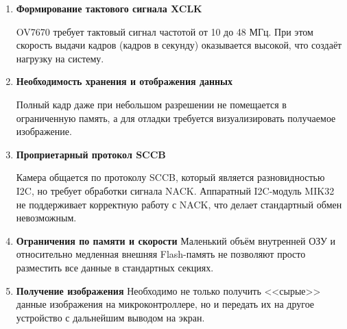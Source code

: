 \documentclass[a4paper]{article}
\begin{document}
    \begin{enumerate}
        \item \textbf{Формирование тактового сигнала XCLK}

        OV7670 требует тактовый сигнал частотой от 10 до 48 МГц. При этом скорость выдачи кадров (кадров в секунду) оказывается высокой, что создаёт нагрузку на систему.

        \item \textbf{Необходимость хранения и отображения данных}

        Полный кадр даже при небольшом разрешении не помещается в ограниченную память, а для отладки требуется визуализировать получаемое изображение.

        \item \textbf{Проприетарный протокол SCCB}

        Камера общается по протоколу SCCB, который является разновидностью I2C, но требует обработки сигнала NACK. Аппаратный I2C-модуль MIK32 не поддерживает корректную работу с NACK, что делает стандартный обмен невозможным.


        \item \textbf{Ограничения по памяти и скорости}
        Маленький объём внутренней ОЗУ и относительно медленная внешняя Flash-память не позволяют просто разместить все данные в стандартных секциях.

        
        \item  \textbf{Получение изображения}
        Необходимо не только получить <<сырые>> данные изображения на микроконтроллере, но и передать их на другое устройство с дальнейшим выводом на экран.

    \end{enumerate}
\end{document}
